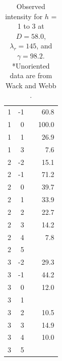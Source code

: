\begin{table}[htbp]
\begin{tabular}{rrrr}
    \hline
    1 & -1 &  & 60.8 \\
    1 &  0 &  & 100.0 \\
    1 &  1 &  & 26.9 \\
    1 &	 3 &  & 7.6 \\
    2 &	-2 &  & 15.1 \\
    2 &	-1 &  & 71.2 \\
    2 &  0 &  & 39.7 \\
    2 &	 1 &  & 33.9 \\
    2	&  2 &  & 22.7 \\
    2 &	 3 &  & 14.2 \\
    2	&  4 &  & 7.8 \\
    2	&  5 &  & \\
	  3 &	-2 &  & 29.3 \\
    3	& -1 &  & 44.2 \\
    3	&  0 &  & 12.0 \\
    3	&  1 &  & \\
    3	&  2 &  & 10.5 \\
    3	&  3 &  & 14.9 \\
    3	&  4 &  & 10.0 \\
    3	&  5 &  & \\
    \hline
  \end{tabular}
  \caption{Observed intensity for $h$ = 1 to 3 at $D=58.0$, $\lambda_r=145$, and 
  $\gamma=98.2$\textdegree. *Unoriented data are from Wack and Webb \cite{ref:Wack89}.}
  \label{tb:obs_intensity1}
\end{table}

